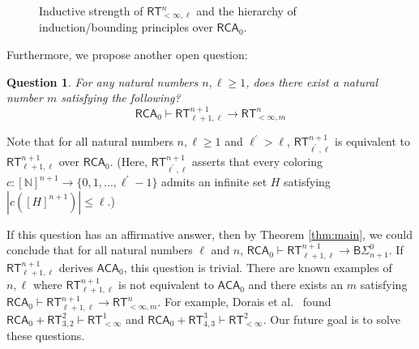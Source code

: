 \documentclass[10pt,reqno]{amsart}
\newtheorem{question}[theorem]{Question}
\numberwithin{equation}{section}
\begin{document}
\begin{figure}[htbp]
\centering
{}


\caption{Inductive strength of $\mathsf{RT}_{<\infty,\ell}^n$ and the hierarchy of induction/bounding principles over $\mathsf{RCA}_0$.}
\label{fig:hierarchy}
\end{figure}

Furthermore, we propose another open question:
\begin{question}
 For any natural numbers $n, \ell \ge 1$, does there exist a natural number $m$ satisfying the following?
 \[ \mathsf{RCA}_0\vdash\mathsf{RT}_{\ell+1,\ell}^{n+1}\rightarrow\mathsf{RT}_{<\infty,m}^{n} \]
\end{question}
Note that for all natural numbers $n, \ell \ge 1$ and $\ell^{\prime}>\ell$, $\mathsf{RT}_{\ell^{\prime},\ell}^{n+1}$ is equivalent to $\mathsf{RT}_{\ell+1,\ell}^{n+1}$ over $\mathsf{RCA}_0$.
(Here, $\mathsf{RT}_{\ell^{\prime},\ell}^{n+1}$ asserts that every coloring $c\colon[\mathbb{N}]^{n+1}\rightarrow\{0,1,\dots,\ell^{\prime}-1\}$ admits an infinite set $H$ satisfying $|c([H]^{n+1}) |\le \ell$.)


If this question has an affirmative answer, then by Theorem \ref{thm:main}, we could conclude that for all natural numbers $\ell$ and $n$, $\mathsf{RCA}_0\vdash\mathsf{RT}_{\ell+1,\ell}^{n+1}\rightarrow\mathsf{B}\Sigma_{n+1}^{0}$.
If $\mathsf{RT}_{\ell+1,\ell}^{n+1}$ derives $\mathsf{ACA}_0$, this question is trivial. There are known examples of $n,\ell$ where $\mathsf{RT}_{\ell+1,\ell}^{n+1}$ is not equivalent to $\mathsf{ACA}_0$ and there exists an $m$ satisfying $\mathsf{RCA}_0\vdash\mathsf{RT}_{\ell+1,\ell}^{n+1}\rightarrow\mathsf{RT}_{<\infty,m}^{n}$. For example, Dorais et al.~\cite[Propositions 5.6 and 5.7]{Dorais-Dzhafarov-Hirst-Mileti-Shafer} found $\mathsf{RCA}_0+\mathsf{RT}_{3,2}^{2}\vdash\mathsf{RT}_{<\infty}^{1}$ and $\mathsf{RCA}_0+\mathsf{RT}_{4,3}^{3}\vdash\mathsf{RT}_{<\infty}^{2}$. Our future goal is to solve these questions.



\end{document}

